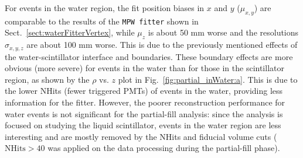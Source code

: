 For events in the water region, the fit position biases in $x$ and $y$ ($\mu_{x,y}$) are comparable to the results of the \texttt{MPW fitter} shown in Sect.~\ref{sect:waterFitterVertex}, while $\mu_z$ is about 50 mm worse and the resolutions $\sigma_{x,y,z}$ are about 100 mm worse. This is due to the previously mentioned effects of the water-scintillator interface and boundaries. These boundary effects are more obvious (more severe) for events in the water than for those in the scintillator region, as shown by the $\rho$ vs. $z$ plot in Fig.~\ref{fig:partial_inWater:a}. This is due to the lower NHits (fewer triggered PMTs) of events in the water, providing less information for the fitter. However, the poorer reconstruction performance for water events is not significant for the partial-fill analysis: since the analysis is focused on studying the liquid scintillator, events in the water region are less interesting and are mostly removed by the NHits and fiducial volume cuts ($\mathrm{NHits}>40$ was applied on the data processing during the partial-fill phase). 

